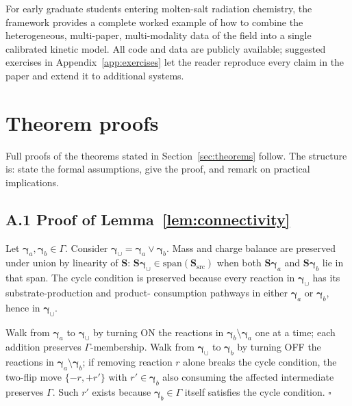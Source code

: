 \documentclass[12pt]{article}
\theoremstyle{plain}
\theoremstyle{definition}
\theoremstyle{remark}
\begin{document}
For early graduate students entering molten-salt radiation chemistry, the
framework provides a complete worked example of how to combine the
heterogeneous, multi-paper, multi-modality data of the field into a single
calibrated kinetic model.  All code and data are publicly available;
suggested exercises in Appendix~\ref{app:exercises} let the reader
reproduce every claim in the paper and extend it to additional systems.

\appendix
\section{Theorem proofs}\label{app:proofs}

Full proofs of the theorems stated in Section~\ref{sec:theorems} follow.
The structure is:  state the formal assumptions, give the proof, and remark
on practical implications.

\subsection*{A.1 Proof of Lemma~\ref{lem:connectivity}}

Let $\boldsymbol\gamma_a, \boldsymbol\gamma_b \in \Gamma$.  Consider
$\boldsymbol\gamma_\cup = \boldsymbol\gamma_a \lor \boldsymbol\gamma_b$.
Mass and charge balance are preserved under union by linearity of
$\mathbf{S}$:  $\mathbf{S}\boldsymbol\gamma_\cup \in
\mathrm{span}(\mathbf{S}_{\mathrm{src}})$ when both
$\mathbf{S}\boldsymbol\gamma_a$ and $\mathbf{S}\boldsymbol\gamma_b$ lie in
that span.  The cycle condition is preserved because every reaction in
$\boldsymbol\gamma_\cup$ has its substrate-production and product-
consumption pathways in either $\boldsymbol\gamma_a$ or
$\boldsymbol\gamma_b$, hence in $\boldsymbol\gamma_\cup$.

Walk from $\boldsymbol\gamma_a$ to $\boldsymbol\gamma_\cup$ by turning ON
the reactions in $\boldsymbol\gamma_b\setminus\boldsymbol\gamma_a$ one at a
time; each addition preserves $\Gamma$-membership.  Walk from
$\boldsymbol\gamma_\cup$ to $\boldsymbol\gamma_b$ by turning OFF the
reactions in $\boldsymbol\gamma_a\setminus\boldsymbol\gamma_b$; if removing
reaction $r$ alone breaks the cycle condition, the two-flip move
$\{-r, +r'\}$ with $r'\in\boldsymbol\gamma_b$ also consuming the affected
intermediate preserves $\Gamma$.  Such $r'$ exists because
$\boldsymbol\gamma_b\in\Gamma$ itself satisfies the cycle condition.
\hfill$\square$
\end{document}
